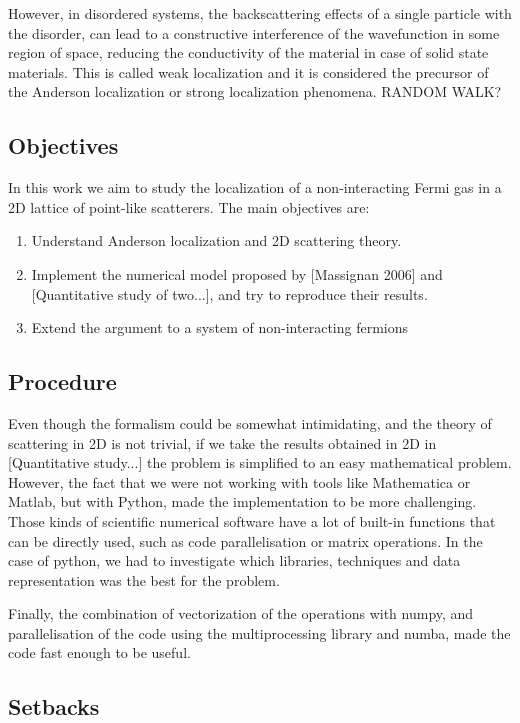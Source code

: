 However, in disordered systems, the backscattering effects of a single particle with the disorder, can lead to a constructive interference of the wavefunction in some region of space, reducing the conductivity of the material in case of solid state materials. This is called weak localization and it is considered the precursor of the Anderson localization or strong localization phenomena. RANDOM WALK?

\subsection{Objectives}

In this work we aim to study the localization of a non-interacting Fermi gas in a 2D lattice of point-like scatterers. The main objectives are:

\begin{enumerate}
    \item Understand Anderson localization and 2D scattering theory.
    \item Implement the numerical model proposed by [Massignan 2006] and [Quantitative study of two...], and try to reproduce their results.
    \item Extend the argument to a system of non-interacting fermions
\end{enumerate}

\subsection{Procedure}

Even though the formalism could be somewhat intimidating, and the theory of scattering in 2D is not trivial, if we take the results obtained in 2D in [Quantitative study...] the problem is simplified to an easy mathematical problem. However, the fact that we were not working with tools like Mathematica or Matlab, but with Python, made the implementation to be more challenging. Those kinds of scientific numerical software have a lot of built-in functions that can be directly used, such as code parallelisation or matrix operations. In the case of python, we had to investigate which libraries, techniques and data representation was the best for the problem. 

Finally, the combination of vectorization of the operations with numpy, and parallelisation of the code using the multiprocessing library and numba, made the code fast enough to be useful.

\subsection{Setbacks}

